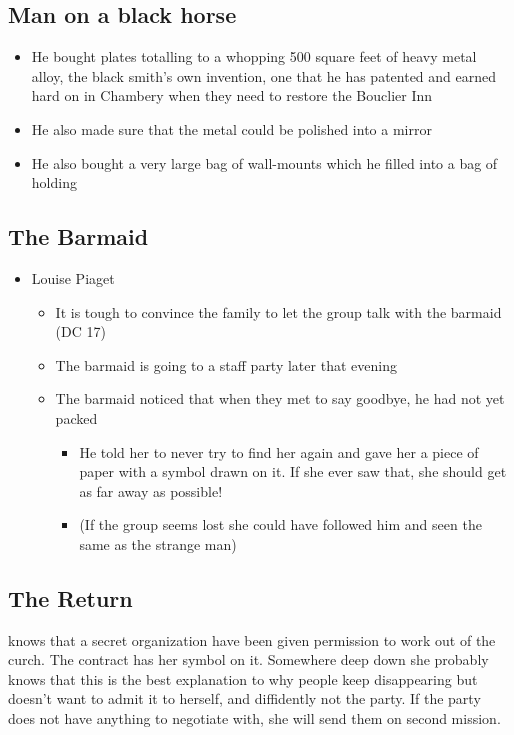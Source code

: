 \subsection*{Man on a black horse}
\begin{itemize}
    \item He bought plates totalling to a whopping 500 square feet of heavy metal alloy, the black smith's own invention, one that he has patented and earned hard on in Chambery when they need to restore the Bouclier Inn
    \item He also made sure that the metal could be polished into a mirror
    \item He also bought a very large bag of wall-mounts which he filled into a bag of holding
\end{itemize}

\subsection*{The Barmaid}
\begin{itemize}
    \item Louise Piaget
    \begin{itemize}
        \item It is tough to convince the family to let the group talk with the barmaid (DC 17)
        \item The barmaid is going to a staff party later that evening
        \item The barmaid noticed that when they met to say goodbye, he had not yet packed 
        \begin{itemize}
            \item He told her to never try to find her again and gave her a piece of paper with a symbol drawn on it. If she ever saw that, she should get as far away as possible!
            \item (If the group seems lost she could have followed him and seen the same as the strange man)
        \end{itemize}
    \end{itemize}
\end{itemize}

\subsection*{The Return}
 knows that a secret organization have been given permission to work out of the curch. The contract has her symbol on it. Somewhere deep down she probably knows that this is the best explanation to why people keep disappearing but doesn't want to admit it to herself, and diffidently not the party. If the party does not have anything to negotiate with, she will send them on second mission.
